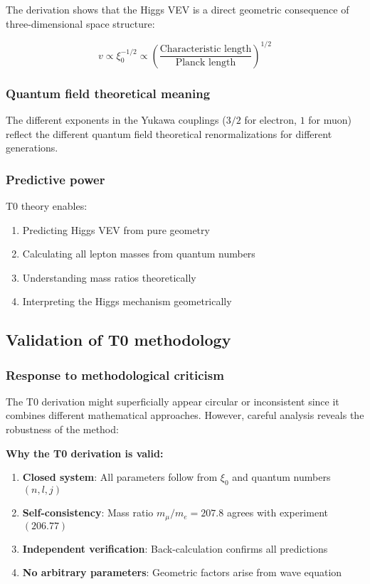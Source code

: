 \documentclass[12pt,a4paper]{article}
\begin{document}
The derivation shows that the Higgs VEV is a direct geometric consequence of three-dimensional space structure:

\begin{equation}
	v \propto \xi_0^{-1/2} \propto \left(\frac{\text{Characteristic length}}{\text{Planck length}}\right)^{1/2}
\end{equation}

\subsubsection{Quantum field theoretical meaning}

The different exponents in the Yukawa couplings ($3/2$ for electron, $1$ for muon) reflect the different quantum field theoretical renormalizations for different generations.

\subsubsection{Predictive power}

T0 theory enables:

\begin{enumerate}
	\item Predicting Higgs VEV from pure geometry
	\item Calculating all lepton masses from quantum numbers
	\item Understanding mass ratios theoretically
	\item Interpreting the Higgs mechanism geometrically
\end{enumerate}

\subsection{Validation of T0 methodology}

\subsubsection{Response to methodological criticism}

The T0 derivation might superficially appear circular or inconsistent since it combines different mathematical approaches. However, careful analysis reveals the robustness of the method:

\begin{tcolorbox}[colback=blue!5!white,colframe=blue!75!black,title=Methodological Consistency]
	\textbf{Why the T0 derivation is valid:}
	
	\begin{enumerate}
		\item \textbf{Closed system}: All parameters follow from $\xi_0$ and quantum numbers $(n,l,j)$
		\item \textbf{Self-consistency}: Mass ratio $m_\mu/m_e = 207.8$ agrees with experiment $(206.77)$
		\item \textbf{Independent verification}: Back-calculation confirms all predictions
		\item \textbf{No arbitrary parameters}: Geometric factors arise from wave equation
	\end{enumerate}
\end{tcolorbox}
\end{document}
